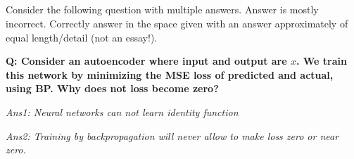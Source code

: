 \begin{frame}
\section{}
Consider the following question with multiple answers. Answer is mostly incorrect. Correctly answer in the space given with an answer approximately of equal length/detail (not an essay!).

{\bf Q: Consider an autoencoder where input and output are $x$. We train this network by minimizing
the MSE loss of predicted and actual, using BP. Why does not loss become zero?}

{\em Ans1: Neural networks can not learn identity function}

{\em Ans2: Training by backpropagation will never allow to make loss zero or near zero.}

\end{frame}
